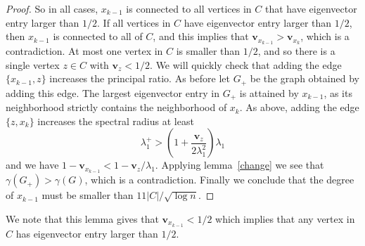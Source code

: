 \begin{proof}
  So in all cases, $x_{k-1}$ is connected to all vertices in $C$ that have
  eigenvector entry larger than $1/2$.  If all vertices in $C$ have eigenvector
  entry larger than $1/2$, then $x_{k-1}$ is connected to all of $C$,
  and this implies that $\mathbf{v}_{x_{k-1}} > \mathbf{v}_{x_k}$, which is a contradiction.
  At most one vertex in $C$ is smaller than $1/2$, and so
  there is a single vertex $z \in C$ with $\mathbf{v}_z < 1/2$.  We will
  quickly check that adding the edge $\{ x_{k-1}, z\}$ increases
  the principal ratio.  As before let $G_+$ be the graph obtained by
  adding this edge.  The largest eigenvector entry in $G_+$ is
  attained by $x_{k-1}$, as its neighborhood strictly contains the neighborhood
  of $x_{k}$.  
  As above, adding the edge $\{ z, x_{k}\}$ increases the spectral radius
  at least
   \[ \lambda_1^+ > \left(1 + \frac{\mathbf{v}_z}{2\lambda_1^2} \right) \lambda_1 \]
  and we have $1 - \mathbf{v}_{x_{k-1}} < 1 - \mathbf{v}_z/\lambda_1$.  Applying lemma~\ref{change}
  we see that $\gamma(G_+) > \gamma(G)$, which is a contradiction.
  Finally we conclude that the degree of $x_{k-1}$ must be smaller than
  $11 |C| / \sqrt{\log n}$.
\end{proof}

We note that this lemma gives that $\mathbf{v}_{x_{k-1}} < 1/2$ which implies that any vertex in $C$ has eigenvector entry larger than $1/2$.


